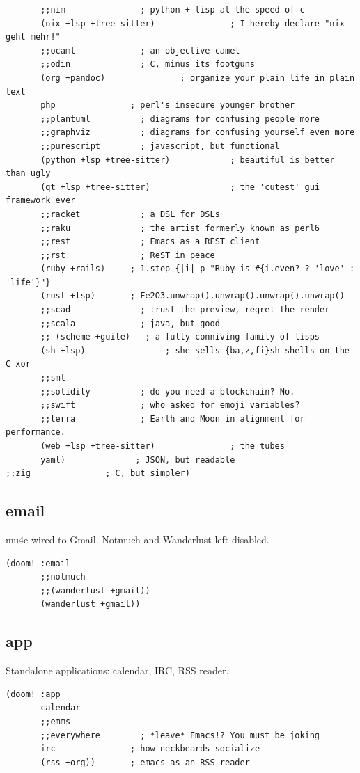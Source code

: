 \documentclass[11pt]{article}
\begin{document}
\begin{verbatim}
       ;;nim               ; python + lisp at the speed of c
       (nix +lsp +tree-sitter)               ; I hereby declare "nix geht mehr!"
       ;;ocaml             ; an objective camel
       ;;odin              ; C, minus its footguns
       (org +pandoc)               ; organize your plain life in plain text
       php               ; perl's insecure younger brother
       ;;plantuml          ; diagrams for confusing people more
       ;;graphviz          ; diagrams for confusing yourself even more
       ;;purescript        ; javascript, but functional
       (python +lsp +tree-sitter)            ; beautiful is better than ugly
       (qt +lsp +tree-sitter)                ; the 'cutest' gui framework ever
       ;;racket            ; a DSL for DSLs
       ;;raku              ; the artist formerly known as perl6
       ;;rest              ; Emacs as a REST client
       ;;rst               ; ReST in peace
       (ruby +rails)     ; 1.step {|i| p "Ruby is #{i.even? ? 'love' : 'life'}"}
       (rust +lsp)       ; Fe2O3.unwrap().unwrap().unwrap().unwrap()
       ;;scad              ; trust the preview, regret the render
       ;;scala             ; java, but good
       ;; (scheme +guile)   ; a fully conniving family of lisps
       (sh +lsp)                ; she sells {ba,z,fi}sh shells on the C xor
       ;;sml
       ;;solidity          ; do you need a blockchain? No.
       ;;swift             ; who asked for emoji variables?
       ;;terra             ; Earth and Moon in alignment for performance.
       (web +lsp +tree-sitter)               ; the tubes
       yaml)              ; JSON, but readable
;;zig               ; C, but simpler)
\end{verbatim}
\subsection{email}
\label{sec:org0b4ae70}
mu4e wired to Gmail. Notmuch and Wanderlust left disabled.

\begin{verbatim}
(doom! :email
       ;;notmuch
       ;;(wanderlust +gmail))
       (wanderlust +gmail))
\end{verbatim}
\subsection{app}
\label{sec:org82cd0a5}
Standalone applications: calendar, IRC, RSS reader.

\begin{verbatim}
(doom! :app
       calendar
       ;;emms
       ;;everywhere        ; *leave* Emacs!? You must be joking
       irc               ; how neckbeards socialize
       (rss +org))       ; emacs as an RSS reader
\end{verbatim}
\end{document}
